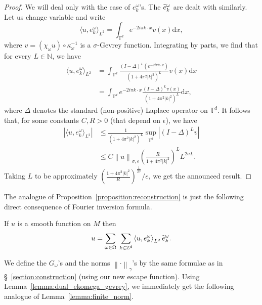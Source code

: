 \documentclass[AHL,Unicode,longabstracts,published]{cedram}
\newcommand{\p}[1]{\left(#1\right)}
\newcommand{\n}[1]{\left\|#1\right\|}
\newcommand{\va}[1]{\left|#1\right|}
\newcommand{\brac}[1]{\langle #1 \rangle}
\newcommand{\bbZ}{\mathbb{Z}}
\newcommand{\bbT}{\mathbb{T}}
\newcommand{\bbN}{\mathbb{N}}
\newcommand{\rmd}{\mathrm{d}}
\let\oldtilde\tilde
\renewcommand*{\tilde}[1]{\mathchoice{\widetilde{#1}}{\widetilde{#1}}{\oldtilde{#1}}{\oldtilde{#1}}}
\begin{document}
\begin{proof}
We will deal only with the case of $e_k^\omega$'s. The $\tilde{e}_k^\omega$ are dealt with similarly. Let us change variable and write
\begin{equation*}
\brac{u,e_k^\omega}_{L^2} =\int_{\bbT^d} e^{-2 i \pi k \cdot x} v(x) \rmd x,
\end{equation*}
where $v = (\chi_\omega u) \circ \kappa_\omega^{-1}$ is a $\sigma$-Gevrey function. Integrating by parts, we find that for every $L \in \bbN$, we have
\begin{equation*}
\begin{split}
\brac{u,e_k^\omega}_{L^2} & = \int_{\bbT^d} \frac{(I - \Delta)^L\left(e^{-2 i \pi k \cdot x}\right)}{\left(1+ 4 \pi^2 |k|^2\right)^L} v(x) \rmd x \\
& = \int_{\bbT^d} e^{-2 i \pi k \cdot x} \frac{(I - \Delta)^L v (x)}{\left(1+ 4 \pi^2 |k|^2\right)^L} \rmd x,
\end{split}
\end{equation*}
where $\Delta$ denotes the standard (non-positive) Laplace operator on $\bbT^d$. It follows that, for some constants $C,R > 0$ (that depend on $\epsilon$), we have
\begin{equation*}
\begin{split}
\va{\brac{u,e_k^\omega}_{L^2}} & \leq \frac{1}{\left(1+ 4 \pi^2 |k|^2\right)^L} \sup_{\bbT^d} \va{(I - \Delta)^L v} \\
& \leq C \n{u}_{\sigma,\epsilon} \p{\frac{R}{1+ 4 \pi^2 |k|^2}}^{L} L^{2 \sigma L}.
\end{split}
\end{equation*}
Taking $L$ to be approximately $(\frac{1+ 4 \pi^2 \va{k}^2}{R})^{\frac{1}{2\sigma}}/e$, we get the announced result.
\end{proof}

The analogue of Proposition~\ref{proposition:reconstruction} is just the following direct consequence of Fourier inversion formula.

\begin{prop}
If $u$ is a smooth function on $M$ then
\begin{equation*}
u = \sum_{\omega \in \Omega}\;\sum_{k \in \bbZ^d} \left\langle u, e_k^\omega\right\rangle_{L^2} \tilde{e}^\omega_k.
\end{equation*}
\end{prop}

We define the $G_\omega$'s and the norms $\n{\cdot}_\gamma$'s by the same formulae as in \S~\ref{section:construction} (using our new escape function). Using Lemma~\ref{lemma:dual_ekomega_gevrey}, we immediately get the following analogue of Lemma~\ref{lemma:finite_norm}.
\end{document}
